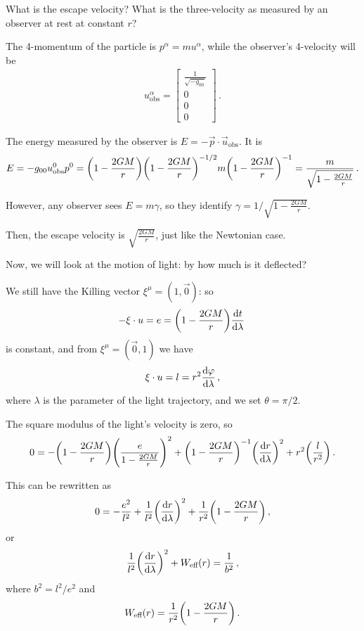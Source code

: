 \documentclass[main.tex]{subfiles}
\begin{document}
What is the escape velocity? What is  the three-velocity as measured by an observer at rest at constant \(r\)?

The 4-momentum of the particle is \(p^{\alpha } = m u^{\alpha }\), while the observer's 4-velocity will be 
%
\begin{align}
  u _{\text{obs}}^{\alpha } = \left[\begin{array}{c}
  \frac{1}{\sqrt{-g_{00} }} \\ 
  0 \\ 
  0 \\ 
  0
  \end{array}\right]
\,.
\end{align}

The energy measured by the observer is \(E = - \vec{p} \cdot \vec{u}_{\text{obs}}\). It is 
%
\begin{align}
  E = - g_{00} u^{0} _{\text{obs}} p^{0}
  = \qty(1 - \frac{2GM}{r}) \qty(1 - \frac{2GM}{r})^{-1/2}
  m \qty(1 - \frac{2GM}{r})^{-1}
  = \frac{m}{\sqrt{1 - \frac{2GM}{r}}}
\,. 
\end{align}
%

However, any observer sees \(E = m \gamma \), so they identify \(\gamma = 1 / \sqrt{1 - \frac{2GM}{r}}\). 

Then, the escape velocity is \(\sqrt{\frac{2GM}{r}}\), just like the Newtonian case. 

Now, we will look at the motion of light: by how much is it deflected? 

We still have the Killing vector \(\xi^{\mu } = (1, \vec{0})\): so 
%
\begin{align}
  - \xi \cdot u = e = \qty(1 - \frac{2GM}{r}) \dv{t}{\lambda } 
\,
\end{align}
%
is constant, and from \(\xi^{\mu }= (\vec{0}, 1)\) we have 
%
\begin{align}
  \xi \cdot u =  l =
  r^2 \dv{\varphi }{\lambda }
\,,
\end{align}
%
where \(\lambda \) is the parameter of the light trajectory, and we set \(\theta = \pi /2\). 

The square modulus of the light's velocity is zero, so 
%
\begin{align}
  0 =
  - \qty(1 - \frac{2GM}{r}) \qty(\frac{e}{1-\frac{2GM}{r}})^2
  + \qty(1 - \frac{2GM}{r})^{-1} \qty(\dv{r}{\lambda })^2 + r^2 \qty(\frac{l}{r^2})
\,. 
\end{align}

This can be rewritten as 
%
\begin{align}
  0= - \frac{e^2}{l^2} + \frac{1}{l^2} \qty(\dv{r}{\lambda })^2 + \frac{1}{r^2} \qty(1 - \frac{2GM}{r})
\,,
\end{align}
%
or 
%
\begin{align}
  \frac{1}{l^2} \qty(\dv{r}{\lambda })^2 + W _{\text{eff}}(r) = \frac{1}{b^2}
\,,
\end{align}
%
where \(b^2 = l^2 / e^2\) and 
%
\begin{align}
  W _{\text{eff}} (r) = \frac{1}{r^2} \qty(1 - \frac{2GM}{r})
\,.
\end{align}
\end{document}
